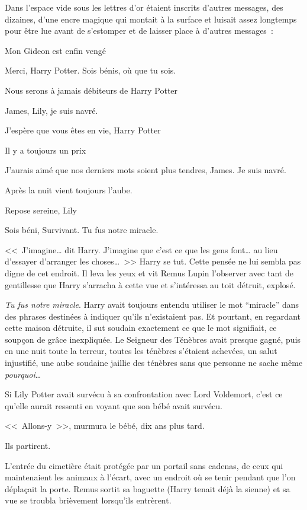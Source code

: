 Dans l'espace vide sous les lettres d'or étaient inscrits d'autres messages, des dizaines, d'une encre magique qui montait à la surface et luisait assez longtemps pour être lue avant de s'estomper et de laisser place à d'autres messages~:
\begin{center}

Mon Gideon est enfin vengé

Merci, Harry Potter. Sois bénis, où que tu sois.

Nous serons à jamais débiteurs de Harry Potter

James, Lily, je suis navré.

J'espère que vous êtes en vie, Harry Potter

Il y a toujours un prix

J'aurais aimé que nos derniers mots soient plus tendres, James. Je suis navré.

Après la nuit vient toujours l'aube.

Repose sereine, Lily

Sois béni, Survivant. Tu fus notre miracle.
\end{center}

<<~J'imagine… dit Harry. J'imagine que c'est ce que les gens font… au lieu d'essayer d'arranger les choses…~>> Harry se tut. Cette pensée ne lui sembla pas digne de cet endroit. Il leva les yeux et vit Remus Lupin l'observer avec tant de gentillesse que Harry s'arracha à cette vue et s'intéressa au toit détruit, explosé.

\emph{Tu fus notre miracle}. Harry avait toujours entendu utiliser le mot “miracle” dans des phrases destinées à indiquer qu'ils n'existaient pas. Et pourtant, en regardant cette maison détruite, il sut soudain exactement ce que le mot signifiait, ce soupçon de grâce inexpliquée. Le Seigneur des Ténèbres avait presque gagné, puis en une nuit toute la terreur, toutes les ténèbres s'étaient achevées, un salut injustifié, une aube soudaine jaillie des ténèbres sans que personne ne sache même \emph{pourquoi}…

Si Lily Potter avait survécu à sa confrontation avec Lord Voldemort, c'est ce qu'elle aurait ressenti en voyant que son bébé avait survécu.

<<~Allons-y~>>, murmura le bébé, dix ans plus tard.

Ils partirent.

L'entrée du cimetière était protégée par un portail sans cadenas, de ceux qui maintenaient les animaux à l'écart, avec un endroit où se tenir pendant que l'on déplaçait la porte. Remus sortit sa baguette (Harry tenait déjà la sienne) et sa vue se troubla brièvement lorsqu'ils entrèrent.

